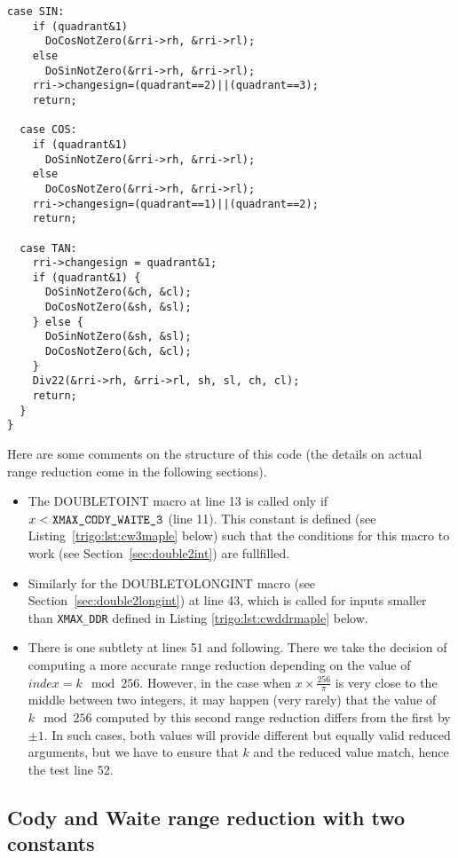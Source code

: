 \begin{lstlisting}[caption={Multilevel range reduction \label{lst:trig:argred}},firstnumber=1]
  case SIN:
    if (quadrant&1)
      DoCosNotZero(&rri->rh, &rri->rl);
    else
      DoSinNotZero(&rri->rh, &rri->rl);
    rri->changesign=(quadrant==2)||(quadrant==3);
    return;

  case COS:
    if (quadrant&1)
      DoSinNotZero(&rri->rh, &rri->rl);
    else
      DoCosNotZero(&rri->rh, &rri->rl);
    rri->changesign=(quadrant==1)||(quadrant==2);
    return;

  case TAN:
    rri->changesign = quadrant&1;
    if (quadrant&1) {
      DoSinNotZero(&ch, &cl);
      DoCosNotZero(&sh, &sl);
    } else {
      DoSinNotZero(&sh, &sl);
      DoCosNotZero(&ch, &cl);
    }
    Div22(&rri->rh, &rri->rl, sh, sl, ch, cl);
    return;
  }
}
\end{lstlisting}


Here are some comments on the structure of this code (the details on
actual range reduction come in the following sections).

\begin{itemize}
\item The DOUBLETOINT macro at line 13 is called only if
  $x<\verb!XMAX_CODY_WAITE_3!$ (line 11). This constant is defined  (see
  Listing~\ref{trigo:lst:cw3maple} below) such
  that the conditions for this macro to work (see
  Section~\ref{sec:double2int}) are fullfilled.

\item Similarly for the DOUBLETOLONGINT macro (see
  Section~\ref{sec:double2longint}) at line 43, which is called for
  inputs smaller than \verb!XMAX_DDR! defined in Listing
  \ref{trigo:lst:cwddrmaple} below.

\item There is one subtlety at lines 51 and following. There we take
  the decision of computing a more accurate range reduction depending
  on the value of $\mathit{index}=k\mod 256$. However, in the case
  when $x\times\frac{256}{\pi}$ is very close to the middle between
  two integers, it may happen (very rarely) that the value of $k\mod
  256$ computed by this second range reduction differs from the first
  by $\pm 1$. In such cases, both values will provide different but
  equally valid reduced arguments, but we have to ensure that $k$ and
  the reduced value match, hence the test line 52.
\end{itemize}



\subsection{Cody and Waite range reduction with two constants}

